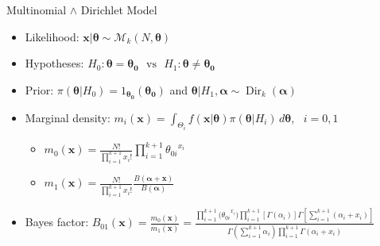 
\begin{frame}{Multinomial $\land$ Dirichlet Model}

\begin{itemize}

\item Likelihood: $\bm{x}|\bm{\theta} \sim \mathcal{M}_k(N,\bm{\theta})$

\item Hypotheses:  $ H_0: \bm{\theta}=\bm{\theta_0} \,\,\,\, \text{vs} \,\,\,\,  H_1: \bm{\theta} \neq \bm{\theta_0}$

\item Prior: $\pi(\bm{\theta}|H_0)={1_{\bm{\theta_0}}(\bm{\theta_0})}$ and $\bm{\theta}|H_1, \bm{\alpha} \sim \operatorname{Dir}_k(\bm{\alpha})$ 

\item Marginal density: $m_i(\bm{x})=\int_{\Theta_i} f(\bm{x}|\bm{\theta})\pi(\bm{\theta}|H_i) \, d\bm{\theta} $, \, $i=0,1$

\begin{itemize}

\item  $m_0(\bm{x})=\frac{N!}{\prod_{i=1}^{k+1}x_i!}\prod_{i=1}^{k+1}{\theta_{0i}}^{x_i}$ 
\item  $m_1(\bm{x})= \frac{N!}{\prod_{i=1}^{k+1}x_i!}\frac{B(\bm{\alpha}+\bm{x})}{B(\bm{\alpha})}$ 

\end{itemize}

\item Bayes factor: $B_{01}(\bm{x}) = \frac{m_0(\bm{x})}{m_1(\bm{x})} = \frac{\prod_{i=1}^{k+1}{(\theta_{0i}}^{x_i}) \prod_{i=1}^{k+1}[\Gamma(\alpha_i)] \Gamma [\sum_{i=1}^{k+1}(\alpha_i+x_i)]}{\Gamma(\sum_{i=1}^{k+1} \alpha_i) \prod_{i=1}^{k+1}\Gamma(\alpha_i+x_i)}$

\end{itemize}

\end{frame}


